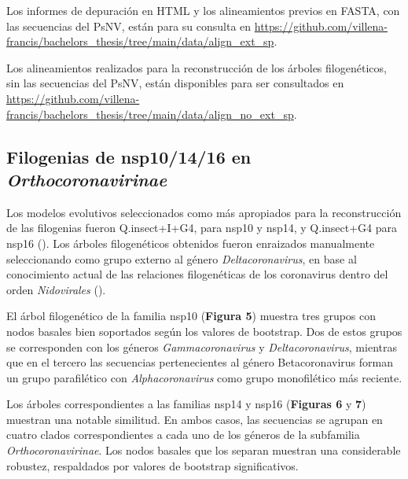 Los informes de depuración en HTML y los alineamientos previos en FASTA, con
las secuencias del PsNV, están para su consulta en \url{https://github.com/villena-francis/bachelors_thesis/tree/main/data/align_ext_sp}.

Los alineamientos realizados para la reconstrucción de los árboles 
filogenéticos, sin las secuencias del PsNV, están disponibles para ser 
consultados en \url{https://github.com/villena-francis/bachelors_thesis/tree/main/data/align_no_ext_sp}.

\subsection{Filogenias de nsp10/14/16 en \textit{Orthocoronavirinae}}

Los modelos evolutivos seleccionados como más apropiados para la 
reconstrucción de las filogenias fueron Q.insect+I+G4, para nsp10 y nsp14, 
y Q.insect+G4 para nsp16 (\cite{cuongbb_all_2022}). Los árboles 
filogenéticos obtenidos fueron enraizados manualmente seleccionando como 
grupo externo al género \textit{Deltacoronavirus}, en base al conocimiento 
actual de las relaciones filogenéticas de los coronavirus dentro del orden 
\textit{Nidovirales} (\cite{zhou_taxonomy_2021}).

El árbol filogenético de la familia nsp10 (\textbf{Figura 5}) muestra tres 
grupos con nodos basales bien soportados según los valores de bootstrap. Dos
de estos grupos se corresponden con los géneros \textit{Gammacoronavirus} y 
\textit{Deltacoronavirus}, mientras que en el tercero las secuencias 
pertenecientes al género Betacoronavirus forman un grupo parafilético con 
\textit{Alphacoronavirus} como grupo monofilético más reciente. 

Los árboles correspondientes a las familias nsp14 y nsp16 (\textbf{Figuras 
6} y \textbf{7}) muestran una notable similitud. En ambos casos, las 
secuencias se agrupan en cuatro clados correspondientes a cada uno de los 
géneros de la subfamilia \textit{Orthocoronavirinae}. Los nodos basales que 
los separan muestran una considerable robustez, respaldados por valores de 
bootstrap significativos.


